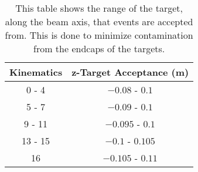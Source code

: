 \begin{table}
\begin{center}
\begin{tabular}{|c|c|}
\hline
\textbf{Kinematics} & \textbf{z-Target Acceptance (m)}\\
\hline\hline
0 - 4 & $-0.08$ - $0.1$ \\ \hline
5 - 7 & $-0.09$ - $0.1$ \\ \hline
9 - 11 & $-0.095$ - $0.1$ \\ \hline
13 - 15 & $-0.1$ - $0.105$ \\ \hline
16 & $-0.105$ - $0.11$ \\ \hline
\end{tabular}
\caption{This table shows the range of the target, along the beam axis, that events are accepted from. This is done to minimize contamination from the endcaps of the targets.}
\label{tbl:ztar}
\end{center}
\end{table}